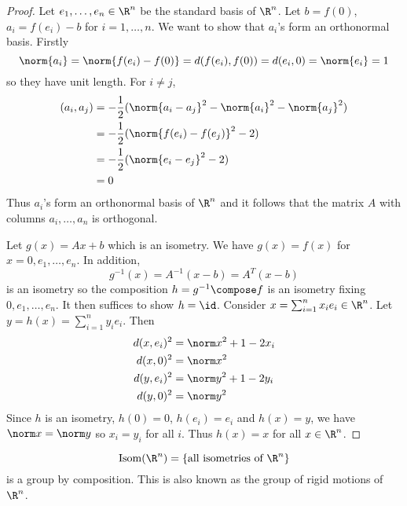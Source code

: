 \documentclass[a4paper]{article}
\DeclareMathOperator{\Isom}{Isom}
\begin{document}
\begin{proof}
  Let \(e_1, \dots, e_n \in \R^n\) be the standard basis of \(\R^n\). Let \(b = f(0)\), \(a_i = f(e_i) - b\) for \(i = 1, \dots, n\). We want to show that \(a_i\)'s form an orthonormal basis. Firstly
  \[
    \norm{a_i} = \norm{f(e_i) - f(0)} = d(f(e_i), f(0)) = d(e_i, 0) = \norm{e_i} = 1
  \]
  so they have unit length. For \(i \neq j\),
  \begin{align*}
    (a_i, a_j) &= -\frac{1}{2}(\norm{a_i - a_j}^2 - \norm{a_i}^2 - \norm{a_j}^2) \\
               &= -\frac{1}{2}(\norm{f(e_i) - f(e_j)}^2 - 2) \\
               &= -\frac{1}{2}(\norm{e_i - e_j}^2 - 2) \\
               &= 0
  \end{align*}
  Thus \(a_i\)'s form an orthonormal basis of \(\R^n\) and it follows that the matrix \(A\) with columns \(a_i, \dots, a_n\) is orthogonal.

  Let \(g(x) = Ax + b\) which is an isometry. We have \(g(x) = f(x)\) for \(x = 0, e_1, \dots, e_n\). In addition,
  \[
    g^{-1}(x) = A^{-1}(x - b) = A^T(x - b)
  \]
  is an isometry so the composition \(h = g^{-1} \compose f\) is an isometry fixing \(0, e_1, \dots, e_n\). It then suffices to show \(h = \id\). Consider \(x = \sum_{i = 1}^n x_ie_i \in \R^n\). Let \(y = h(x) = \sum_{i = 1}^n y_ie_i\). Then
\begin{align*}
  d(x, e_i)^2 &= \norm x^2 + 1 - 2x_i \\
  d(x, 0)^2 &= \norm x^2 \\
  d(y, e_i)^2 &= \norm y^2 + 1 - 2y_i \\
  d(y, 0)^2 &= \norm y^2
\end{align*}
Since \(h\) is an isometry, \(h(0) = 0\), \(h(e_i) = e_i\) and \(h(x) = y\), we have \(\norm x = \norm y\) so \(x_i = y_i\) for all \(i\). Thus \(h(x) = x\) for all \(x \in \R^n\).
\end{proof}

\begin{remark}
  \[
    \Isom(\R^n) = \{\text{all isometries of } \R^n\}
  \]
  is a group by composition. This is also known as the group of rigid motions of \(\R^n\).
\end{remark}
\end{document}
